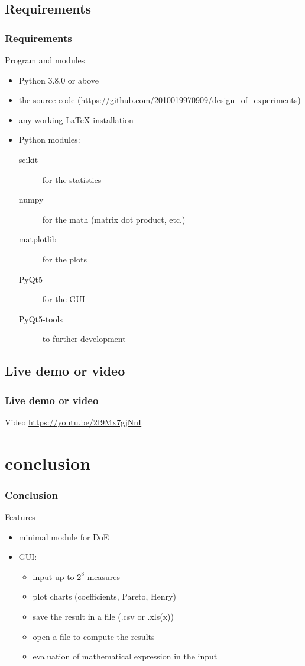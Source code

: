\documentclass[compress, english, aspectratio=169]{beamer}
\begin{document}
\subsection{Requirements}
\begin{frame}
\frametitle{Requirements}
\begin{block}{Program and modules}
\begin{itemize}
\item Python 3.8.0 or above
\item the source code (\url{https://github.com/2010019970909/design_of_experiments})
\item any working LaTeX installation
\item Python modules:\\
\begin{description}
\item[scikit] for the statistics
\item[numpy] for the math (matrix dot product, etc.)
\item[matplotlib] for the plots
\item[PyQt5] for the GUI
\item[PyQt5-tools] to further development
\end{description}
\end{itemize}
\end{block}
\end{frame}

\subsection{Live demo or video}
\begin{frame}
\frametitle{Live demo or video}
\begin{block}{Video}
\url{https://youtu.be/2I9Mx7gjNnI}
\end{block}
\end{frame}

\section{conclusion}
\begin{frame}
\frametitle{Conclusion}
\begin{block}{Features}
\begin{itemize}
\item minimal module for DoE
\item GUI:
\begin{itemize}
\item input up to $2^8$ measures
\item plot charts (coefficients, Pareto, Henry)
\item save the result in a file (.csv or .xls(x))
\item open a file to compute the results
\item evaluation of mathematical expression in the input
\end{itemize}
\end{itemize}
\end{block}
\end{frame}
\end{document}
